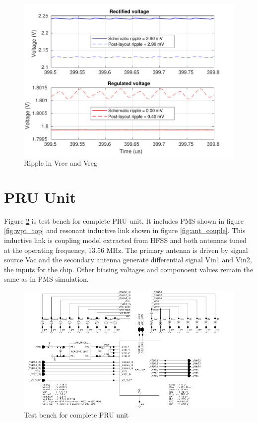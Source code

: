 \documentclass[UKenglish]{ifimaster}  %
\begin{document}
\begin{figure} [H]
  \centering
  \includegraphics[width=\textwidth]{img/wpt_ripple_wo_bgr_both.pdf} 
 \caption{Ripple in Vrec and Vreg} 
\label{fig:wpt_ripple_wo} 
\end{figure}


\section{PRU Unit}

Figure \ref{fig:wpt_top_link} is test bench for complete PRU unit. It includes PMS shown in figure \ref{fig:wpt_top} and resonant inductive link shown in figure \ref{fig:ant_couple}. This inductive link is coupling model extracted from HFSS and both antennas tuned at the operating frequency, 13.56 MHz. The primary antenna is driven by signal source Vac and the secondary antenna generate differential signal Vin1 and Vin2, the inputs for the chip. Other biasing voltages and componoent values remain the same as in PMS simulation. \\

\begin{figure} [H]
  \centering
  \includegraphics[width=\textwidth]{img/wpt_top_link.pdf} 
 \caption{Test bench for complete PRU unit } 
\label{fig:wpt_top_link} 
\end{figure}
\end{document}

